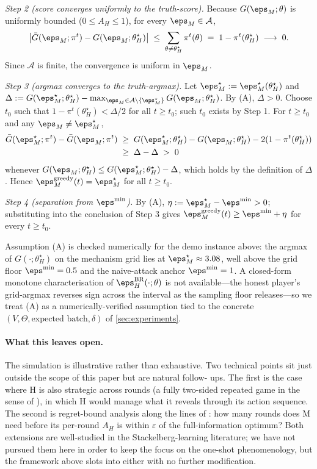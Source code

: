 \emph{Step 2 (score converges uniformly to the truth-score).}
Because $G(\eps_M; \theta)$ is uniformly bounded ($0 \leq A_H \leq 1$),
for every $\eps_M \in \mathcal{A}$,
\[
\bigl|\bar G(\eps_M; \pi^t) - G(\eps_M; \theta_H^\star)\bigr|
\;\leq\; \sum_{\theta \neq \theta_H^\star} \pi^t(\theta)
\;=\; 1 - \pi^t(\theta_H^\star) \;\longrightarrow\; 0.
\]
Since $\mathcal{A}$ is finite, the convergence is uniform in $\eps_M$.

\emph{Step 3 (argmax converges to the truth-argmax).}
Let $\eps_M^\star := \eps_M^\star(\theta_H^\star)$ and
$\Delta := G(\eps_M^\star; \theta_H^\star) - \max_{\eps_M \in
\mathcal{A} \setminus \{\eps_M^\star\}} G(\eps_M; \theta_H^\star)$. By
(A), $\Delta > 0$. Choose $t_0$ such that
$1 - \pi^t(\theta_H^\star) < \Delta / 2$ for all $t \geq t_0$; such
$t_0$ exists by Step 1. For $t \geq t_0$ and any $\eps_M \neq
\eps_M^\star$,
\begin{align*}
\bar G(\eps_M^\star; \pi^t) - \bar G(\eps_M; \pi^t)
&\;\geq\; G(\eps_M^\star; \theta_H^\star) - G(\eps_M; \theta_H^\star)
- 2(1 - \pi^t(\theta_H^\star)) \\
&\;\geq\; \Delta - \Delta \;>\; 0
\end{align*}
whenever $G(\eps_M; \theta_H^\star) \leq G(\eps_M^\star;
\theta_H^\star) - \Delta$, which holds by the definition of $\Delta$.
Hence $\eps_M^{\mathrm{greedy}}(t) = \eps_M^\star$ for all
$t \geq t_0$.

\emph{Step 4 (separation from $\eps^{\min}$).}
By (A), $\eta := \eps_M^\star - \eps^{\min} > 0$; substituting into
the conclusion of Step 3 gives
$\eps_M^{\mathrm{greedy}}(t) \geq \eps^{\min} + \eta$ for every
$t \geq t_0$. \qedhere

\medskip
\noindent Assumption (A) is checked numerically for the demo instance
above: the argmax of $G(\cdot; \theta_H^\star)$ on the mechanism grid
lies at $\eps_M^\star \approx 3.08$, well above the grid floor
$\eps^{\min} = 0.5$ and the naive-attack anchor $\eps^{\min} = 1$. A
closed-form monotone characterisation of $\eps_H^{\mathrm{BR}}(\cdot;
\theta)$ is not available---the honest player's grid-argmax reverses
sign across the interval as the sampling floor releases---so we treat
(A) as a numerically-verified assumption tied to the concrete
$(V, \Theta, \text{expected batch}, \delta)$ of
\cref{sec:experiments}.

\paragraph{What this leaves open.}
The simulation is illustrative rather than exhaustive. Two technical
points sit just outside the scope of this paper but are natural follow-
ups. The first is the case where H is also strategic across rounds
(a fully two-sided repeated game in the sense of
\citet{aumann1995repeated}), in which H would manage what it reveals
through its action sequence. The second is regret-bound analysis along
the lines of \citet{balcan2015commitment}: how many rounds does M need
before its per-round $A_H$ is within $\varepsilon$ of the
full-information optimum? Both extensions are well-studied in the
Stackelberg-learning literature; we have not pursued them here in order
to keep the focus on the one-shot phenomenology, but the framework above
slots into either with no further modification.
